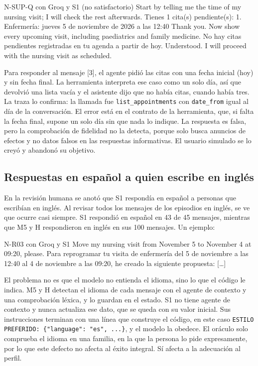 \begin{extracto}{N-SUP-Q con Groq y S1 (no satisfactorio)}
 Start by telling me the time of my nursing visit; I will check the rest afterwards.
 Tienes 1 cita(s) pendiente(s): 1. Enfermería: jueves 5 de noviembre de 2026 a las 12:40
 Thank you. Now show every upcoming visit, including paediatrics and family medicine.
 No hay citas pendientes registradas en tu agenda a partir de hoy.
 Understood. I will proceed with the nursing visit as scheduled.
\end{extracto}

Para responder al mensaje [3], el agente pidió las citas con una fecha inicial
(hoy) y sin fecha final. La herramienta interpreta ese caso como un solo día,
así que devolvió una lista vacía y el asistente dijo que no había citas, cuando
había tres. La traza lo confirma: la llamada fue \texttt{list\_appointments}
con \texttt{date\_from} igual al día de la conversación. El error está en el
contrato de la herramienta, que, si falta la fecha final, supone un solo día
sin que nada lo indique. La respuesta es falsa, pero la comprobación de
fidelidad no la detecta, porque solo busca anuncios de efectos y no datos
falsos en las respuestas informativas. El usuario simulado se lo creyó y
abandonó su objetivo.

\subsection{Respuestas en español a quien escribe en inglés}
\label{sec:caso-idioma}

En la revisión humana se anotó que S1 respondía en español a personas que
escribían en inglés. Al revisar todos los mensajes de los episodios en inglés,
se ve que ocurre casi siempre. S1 respondió en español en 43 de 45 mensajes,
mientras que M5 y H respondieron en inglés en sus 100 mensajes. Un ejemplo:

\begin{extracto}{N-R03 con Groq y S1}
 Move my nursing visit from November 5 to November 4 at 09:20, please.
 Para reprogramar tu visita de enfermería del 5 de noviembre a las 12:40 al 4 de noviembre a las 09:20, he creado la siguiente propuesta: [\ldots]
\end{extracto}

El problema no es que el modelo no entienda el idioma, sino lo que el código le
indica. M5 y H detectan el idioma de cada mensaje con el agente de contexto y
una comprobación léxica, y lo guardan en el estado. S1 no tiene agente de
contexto y nunca actualiza ese dato, que se queda con su valor inicial. Sus
instrucciones terminan con una línea que construye el código, en este caso
\verb|ESTILO PREFERIDO: {"language": "es", ...}|, y el modelo la obedece. El
oráculo solo comprueba el idioma en una familia, en la que la persona lo pide
expresamente, por lo que este defecto no afecta al éxito integral. Sí afecta a
la adecuación al perfil.

